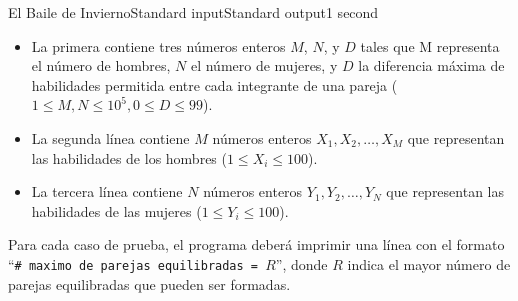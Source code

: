 \begin{problem}{El Baile de Invierno}{Standard input}{Standard output}{1 second}{}
\begin{itemize}
\item La primera contiene tres números enteros $M$, $N$, y $D$ tales que M representa el número de hombres, $N$ el número de mujeres, y $D$ la diferencia máxima de habilidades permitida entre cada integrante de una pareja ($1 \leq M, N \leq 10^5, 0 \leq D \leq 99$).

\item La segunda línea contiene $M$ números enteros $X_1, X_2, \dots, X_M$ que representan las habilidades de los hombres ($1 \leq X_i \leq 100$).

\item La tercera línea contiene $N$ números enteros $Y_1, Y_2, \dots, Y_N$ que representan las habilidades de las mujeres ($1 \leq Y_i \leq 100$).
\end{itemize}

  

\OutputFile
Para cada caso de prueba, el programa deber\'a imprimir una línea con el formato ``\texttt{\# maximo de parejas equilibradas = $R$}'', donde $R$ indica el mayor número de parejas equilibradas que pueden ser formadas.

\Example

\begin{example}
\end{example}

\end{problem}
